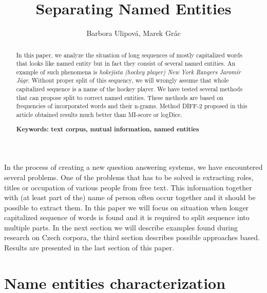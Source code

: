 \documentclass[runningheads]{llncs}
\begin{document}
\mainmatter  %

\title{Separating Named Entities}
\author{Barbora Ulipov\'a, Marek Gr\'ac
}


\maketitle

\begin{abstract}

In this paper, we analyze the situation of long sequences of mostly
capitalized words that looks like named entity but in fact they consist of
several named entities.  An example of such phenomena is {\em hokejista
(hockey player) New York Rangers Jarom\'{i}r J\'{a}gr}.  Without proper
split of this sequency, we will wrongly assume that whole capitalized
sequence is a name of the hockey player.  We have tested several methods
that can propose split to correct named entities.  These methods are based
on frequencies of incorporated words and their n-grams.  Method DIFF-2
proposed in this article obtained results much better than MI-score or
logDice.

{\bf Keywords: text corpus, mutual information, named entities}

\end{abstract}

In the process of creating a new question answering systems, we have
encountered several problems. One of the problems
that has to be solved is extracting roles, titles or occupation of various
people from free text. This information together with (at least part of the)
name of person often occur together and it should be possible to extract
them. In this paper we will focus on situation when longer capitalized
sequence of words is found and it is required to split sequence into
multiple parts. In the next section we will describe examples found during
research on Czech corpora, the third section describes possible approaches
based. Results are presented in the last section of this paper.

\section{Name entities characterization}
\end{document}

